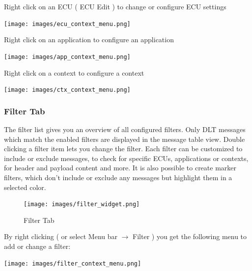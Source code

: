 \documentclass[a4paper,11pt]{article}
\begin{document}
\vspace{0.3cm}

Right click on an ECU ( ECU Edit ) to change or configure ECU settings\linebreak

\vspace{0.1cm}

\texttt{[image: images/ecu\_context\_menu.png]}

\vspace{0.1cm}

Right click on an application to configure an application

\vspace{0.1cm}

\texttt{[image: images/app\_context\_menu.png]}

\vspace{0.1cm}

Right click on a context to configure a context\linebreak

\vspace{0.1cm}

\texttt{[image: images/ctx\_context\_menu.png]}

\vspace{0.1cm}


\subsubsection{Filter Tab}
The filter list gives you an overview of all configured filters. Only DLT messages which match the enabled filters are displayed in the message table view.
Double clicking a filter item lets you change the filter. Each filter can be customized to include or exclude messages, to check for
specific ECUs, applications or contexts, for header and payload content and more. It is also possible to create marker filters, which don't
include or exclude any messages but highlight them in a selected color.


\begin{figure}[H]
 \centering
 \texttt{[image: images/filter\_widget.png]}
 \caption{Filter Tab}
 \label{fig:filtertab}
\end{figure}


By right clicking ( or select Menu bar \ensuremath{\rightarrow} Filter ) you get the following menu to add or change a filter:

\vspace{0.1cm}
\texttt{[image: images/filter\_context\_menu.png]}
\linebreak
\end{document}
